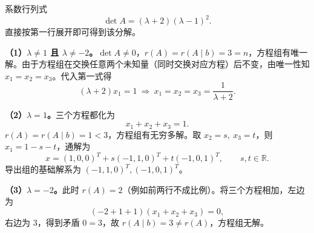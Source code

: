 系数行列式
\[
\det A=(\lambda+2)(\lambda-1)^2.
\]
直接按第一行展开即可得到该分解。

\textbf{（1）$\lambda\neq1$ 且 $\lambda\neq-2$。}$\det A\neq0$，$r(A)=r(A\mid b)=3=n$，方程组有唯一解。由于方程组在交换任意两个未知量（同时交换对应方程）后不变，由唯一性知 $x_1=x_2=x_3$。代入第一式得
\[
(\lambda+2)x_1=1\ \Longrightarrow\ x_1=x_2=x_3=\frac{1}{\lambda+2}.
\]

\textbf{（2）$\lambda=1$。}三个方程都化为
\[
x_1+x_2+x_3=1.
\]
$r(A)=r(A\mid b)=1<3$，方程组有无穷多解。取 $x_2=s,\ x_3=t$，则 $x_1=1-s-t$，通解为
\[
x=(1,0,0)^T+s(-1,1,0)^T+t(-1,0,1)^T,\qquad s,t\in\mathbb R.
\]
导出组的基础解系为 $(-1,1,0)^T,(-1,0,1)^T$。

\textbf{（3）$\lambda=-2$。}此时 $r(A)=2$（例如前两行不成比例）。将三个方程相加，左边为
\[
(-2+1+1)(x_1+x_2+x_3)=0,
\]
右边为 $3$，得到矛盾 $0=3$，故 $r(A\mid b)=3\neq r(A)$，方程组无解。

\else \answerarea[10] \fi%
